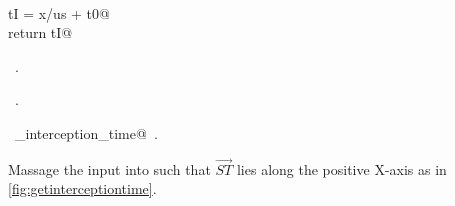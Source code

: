 \documentclass[10pt, english, oneside]{report}
\begin{document}
\begin{flushleft}
\begin{minipage}{\linewidth}
\begin{list}{}{}
\mbox{}\verb@@\\
\mbox{}\verb@    tI = x/us + t0@\\
\mbox{}\verb@    return tI@\\
\mbox{}\verb@@{\NWsep}
\end{list}
\vspace{-1.5ex}
\footnotesize
\begin{list}{}{\setlength{\itemsep}{-\parsep}\setlength{\itemindent}{-\leftmargin}}
\item \NWtxtMacroDefBy\ .
\item \NWtxtMacroRefIn\ .
\item \NWtxtIdentsDefed\nobreak\  \verb@get_interception_time@\nobreak\ .
\item{}
\end{list}
\end{minipage}\vspace{4ex}
\end{flushleft}

Massage the input into such that $\vec{ST}$ lies along the positive X-axis as in \autoref{fig:getinterceptiontime}. 
\end{document}
